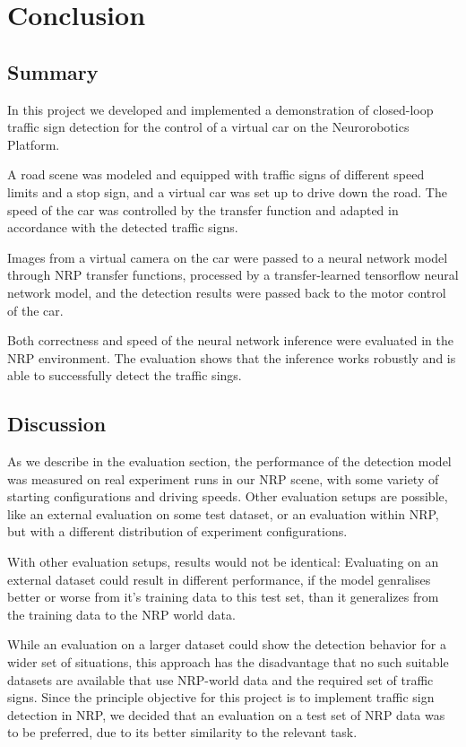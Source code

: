 
\section{Conclusion}

\subsection{Summary}

In this project we developed and implemented a demonstration of closed-loop traffic sign detection for the control of a virtual car on the Neurorobotics Platform. 

A road scene was modeled and equipped with traffic signs of different speed limits and a stop sign, and a virtual car was set up to drive down the road. The speed of the car was controlled by the transfer function and adapted in accordance with the detected traffic signs.

Images from a virtual camera on the car were passed to a neural network model through NRP transfer functions, processed by a transfer-learned tensorflow neural network model, and the detection results were passed back to the motor control of the car.

Both correctness and speed of the neural network inference were evaluated in the NRP environment. The evaluation shows that the inference works robustly and is able to successfully detect the traffic sings.

\subsection{Discussion}
As we describe in the evaluation section, the performance of the detection model was measured on real experiment runs in our NRP scene, with some variety of starting configurations and driving speeds. Other evaluation setups are possible, like an external evaluation on some test dataset, or an evaluation within NRP, but with a different distribution of experiment configurations.

With other evaluation setups, results would not be identical: Evaluating on an external dataset could result in different performance, if the model genralises better or worse from it's training data to this test set, than it generalizes from the training data to the NRP world data.

While an evaluation on a larger dataset could show the detection behavior for a wider set of situations, this approach has the disadvantage that no such suitable datasets are available that use NRP-world data and the required set of traffic signs. Since the principle objective for this project is to implement traffic sign detection in NRP, we decided that an evaluation on a test set of NRP data was to be preferred, due to its better similarity to the relevant task.


